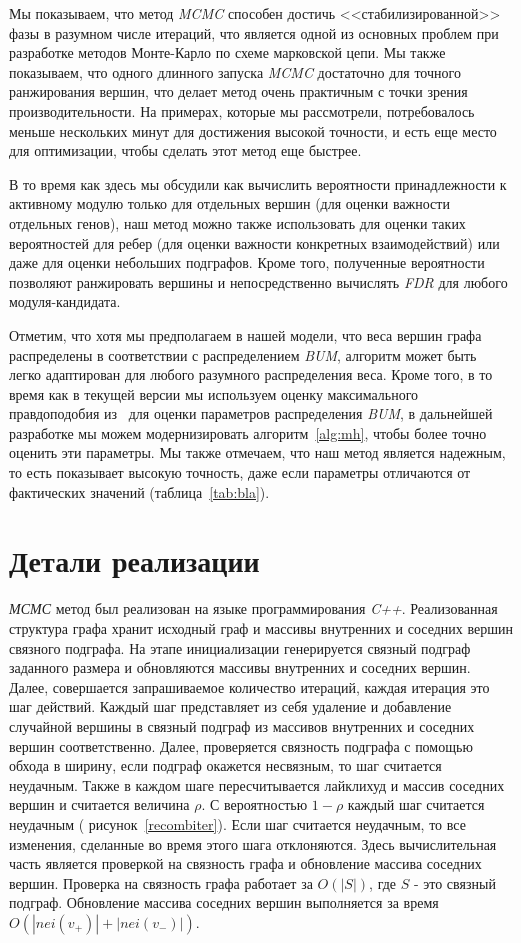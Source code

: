 Мы показываем, что  метод \emph{MCMC} способен достичь <<стабилизированной>>
фазы в разумном числе итераций, что является одной из основных проблем при
разработке методов Монте-Карло по схеме марковской цепи.  Мы также показываем,
что одного длинного запуска \emph{MCMC} достаточно для точного ранжирования
вершин, что делает метод очень практичным с точки зрения производительности.
На примерах, которые мы рассмотрели, потребовалось меньше нескольких минут для
достижения высокой точности, и есть еще место для оптимизации, чтобы сделать
этот метод еще быстрее.

В то время как здесь мы обсудили как вычислить вероятности принадлежности
к активному модулю только для отдельных вершин (для оценки важности отдельных
генов), наш метод можно также использовать для оценки таких вероятностей для
ребер (для оценки важности конкретных взаимодействий) или даже для оценки
небольших подграфов.  Кроме того, полученные вероятности позволяют ранжировать
вершины и непосредственно вычислять \emph{FDR} для любого модуля-кандидата.

Отметим, что хотя мы предполагаем в нашей модели, что веса вершин графа
распределены в соответствии с распределением \emph{BUM}, алгоритм может быть
легко адаптирован для любого разумного распределения веса.  Кроме того, в то
время как в текущей версии мы используем оценку максимального правдоподобия
из~\cite{Beisser2010} для оценки параметров распределения \emph{BUM}, в дальнейшей
разработке мы можем модернизировать алгоритм~\ref{alg:mh}, чтобы более точно
оценить эти параметры.  Мы также отмечаем, что наш метод является надежным, то
есть показывает высокую точность, даже если параметры отличаются от фактических
значений (таблица~\ref{tab:bla}).





\section{Детали реализации}
\emph{МСМС} метод был реализован на языке программирования \emph{C++}.
Реализованная структура графа хранит исходный граф и массивы внутренних
и соседних вершин связного подграфа.  На этапе инициализации генерируется
связный подграф заданного размера и обновляются массивы внутренних и соседних
вершин.  Далее, совершается запрашиваемое количество итераций, каждая итерация
это шаг действий.  Каждый шаг представляет из себя удаление и добавление
случайной вершины в связный подграф из массивов внутренних и соседних вершин
соответственно.  Далее, проверяется связность подграфа с помощью обхода
в ширину, если подграф окажется несвязным, то шаг считается неудачным.  Также
в каждом шаге пересчитывается лайклихуд и массив соседних вершин и считается
величина $\rho$. С вероятностью $1 - \rho$ каждый шаг считается неудачным (
рисунок~\ref{recombiter}).  Если шаг считается неудачным, то все изменения,
сделанные во время этого шага отклоняются.  Здесь вычислительная часть является
проверкой на связность графа и обновление массива соседних вершин.  Проверка на
связность графа работает за $O(|S|)$, где $S$ - это связный подграф.
Обновление массива соседних вершин выполняется за время
$O(|nei(v_+)|+|nei(v_-)|)$.



